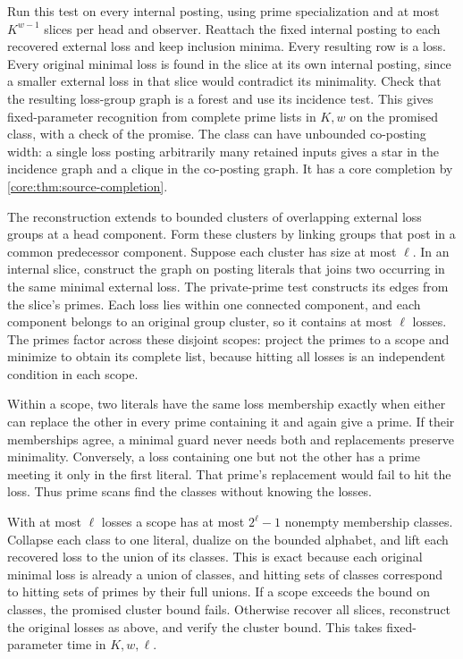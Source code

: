 Run this test on every internal posting, using
prime specialization and at most $K^{w-1}$
slices per head and observer. Reattach the fixed
internal posting to each recovered external loss
and keep inclusion minima. Every resulting row
is a loss. Every original minimal loss is found
in the slice at its own internal posting, since
a smaller external loss in that slice would
contradict its minimality. Check that the resulting
loss-group graph is a forest and use its incidence
test. This gives fixed-parameter recognition from
complete prime lists in $K,w$ on the promised
class, with a check of the promise. The class can
have unbounded co-posting width: a single loss
posting arbitrarily many retained inputs gives a
star in the incidence graph and a clique in the
co-posting graph. It has a core completion by
\cref{core:thm:source-completion}.

The reconstruction extends to bounded clusters
of overlapping external loss groups at a head
component. Form these clusters by linking groups
that post in a common predecessor component.
Suppose each cluster has size at most $\ell$.
In an internal slice, construct the graph on
posting literals that joins two occurring in the
same minimal external loss. The private-prime
test constructs its edges from the slice's primes.
Each loss lies within one connected component,
and each component belongs to an original group
cluster, so it contains at most $\ell$ losses.
The primes factor across these disjoint scopes:
project the primes to a scope and minimize to
obtain its complete list, because hitting all
losses is an independent condition in each scope.

Within a scope, two literals have the same loss
membership exactly when either can replace the
other in every prime containing it and again
give a prime. If their memberships agree, a
minimal guard never needs both and replacements
preserve minimality. Conversely, a loss containing
one but not the other has a prime meeting it
only in the first literal. That prime's replacement
would fail to hit the loss. Thus prime scans find
the classes without knowing the losses.

With at most $\ell$ losses a scope has at most
$2^\ell-1$ nonempty membership classes. Collapse
each class to one literal, dualize on the bounded
alphabet, and lift each recovered loss to the
union of its classes. This is exact because each
original minimal loss is already a union of
classes, and hitting sets of classes correspond
to hitting sets of primes by their full unions.
If a scope exceeds the bound on classes, the
promised cluster bound fails. Otherwise recover
all slices, reconstruct the original losses as
above, and verify the cluster bound. This takes
fixed-parameter time in $K,w,\ell$.

